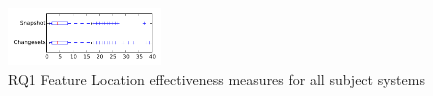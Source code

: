 
\begin{figure}[t]
\centering
\includegraphics[width=0.36\textwidth]{figures/flt/rq1_tiny}
\caption{RQ1 Feature Location effectiveness measures for all subject systems}
\label{fig:flt:rq1:tiny}
\end{figure}
